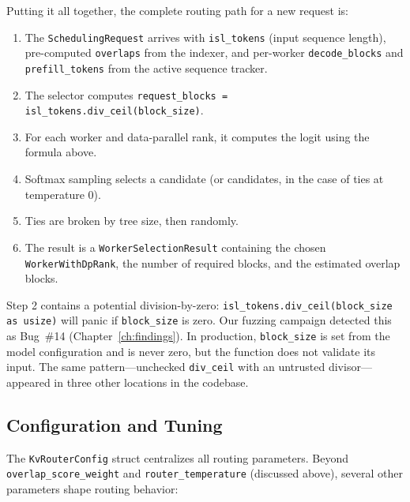 Putting it all together, the complete routing path for a new request is:

\begin{enumerate}
  \item The \texttt{Scheduling\-Request} arrives with \texttt{isl\_tokens} (input sequence length), pre-computed \texttt{overlaps} from the indexer, and per-worker \texttt{decode\_blocks} and \texttt{prefill\_tokens} from the active sequence tracker.
  \item The selector computes \texttt{request\_blocks = isl\_tokens.div\_ceil(block\_size)}.
  \item For each worker and data-parallel rank, it computes the logit using the formula above.
  \item Softmax sampling selects a candidate (or candidates, in the case of ties at temperature 0).
  \item Ties are broken by tree size, then randomly.
  \item The result is a \texttt{WorkerSelectionResult} containing the chosen \texttt{WorkerWithDpRank}, the number of required blocks, and the estimated overlap blocks.
\end{enumerate}

\begin{bugbox}
Step 2 contains a potential division-by-zero: \texttt{isl\_tokens.div\_ceil(block\_size as usize)} will panic if \texttt{block\_size} is zero. Our fuzzing campaign detected this as Bug~\#14 (Chapter~\ref{ch:findings}). In production, \texttt{block\_size} is set from the model configuration and is never zero, but the function does not validate its input. The same pattern---unchecked \texttt{div\_ceil} with an untrusted divisor---appeared in three other locations in the codebase.
\end{bugbox}

\subsection{Configuration and Tuning}

The \texttt{KvRouterConfig} struct centralizes all routing parameters. Beyond \texttt{overlap\_score\_weight} and \texttt{router\_temperature} (discussed above), several other parameters shape routing behavior:

